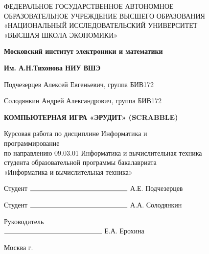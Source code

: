 \begin{titlepage}
	\begin{center}
		ФЕДЕРАЛЬНОЕ  ГОСУДАРСТВЕННОЕ АВТОНОМНОЕ \\
		ОБРАЗОВАТЕЛЬНОЕ УЧРЕЖДЕНИЕ ВЫСШЕГО ОБРАЗОВАНИЯ\\
		«НАЦИОНАЛЬНЫЙ ИССЛЕДОВАТЕЛЬСКИЙ УНИВЕРСИТЕТ\\
		«ВЫСШАЯ ШКОЛА ЭКОНОМИКИ»
	\end{center}
	
	\begin{center}
		\textbf{Московский институт электроники и математики}
		
		\textbf{Им. А.Н.Тихонова НИУ ВШЭ}
	\end{center}
	\vspace{1ex}	
	\begin{center}
		Подчезерцев Алексей Евгеньевич, группа БИВ172
		
		Солодянкин Андрей Александрович, группа БИВ172
	\end{center}	
	\vspace{1ex}
	\begin{center}
		\textbf{КОМПЬЮТЕРНАЯ ИГРА «ЭРУДИТ» (SCRABBLE)}
	\end{center}	
	\vspace{2ex}
	\begin{center}
		Курсовая работа по дисциплине Информатика и\\
		программирование\\
		по направлению 09.03.01 Информатика и вычислительная техника\\
		студента образовательной программы бакалавриата\\
		«Информатика и вычислительная техника»
	\end{center}
	\vspace{2ex}
	\begin{flushright}
		Студент $\rule{5cm}{0.15mm}$ А.Е. Подчезерцев 
		
		\vspace{1ex}
		Студент $\rule{5cm}{0.15mm}$ А.А. Солодянкин 
	\end{flushright}
	\vspace{3ex}
	\begin{flushright}
		Руководитель\\
		$\rule{5cm}{0.15mm}$ Е.А. Ерохина
	\end{flushright}
	\vfill
	\begin{center}
		Москва \the\year г.
	\end{center}
\end{titlepage}